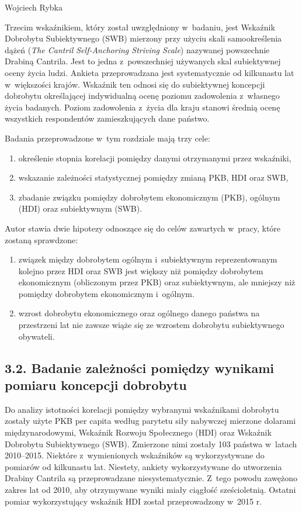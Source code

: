 \begin{artplenv}{Wojciech Rybka}
\enlargethispage{.5\baselineskip}

Trzecim wskaźnikiem, który został uwzględniony w~badaniu, jest Wskaźnik Dobrobytu Subiektywnego (SWB) mierzony przy
użyciu skali samookreślenia dążeń (\textit{The Cantril Self-Anchoring Striving Scale}) nazywanej powszechnie Drabiną
Cantrila. Jest to jedna z~powszechniej używanych skal subiektywnej oceny życia ludzi. Ankieta przeprowadzana jest
systematycznie od kilkunastu lat w~większości krajów. Wskaźnik ten odnosi się do subiektywnej koncepcji dobrobytu
określającej indywidualną ocenę poziomu zadowolenia z~własnego życia badanych. Poziom zadowolenia z~życia dla kraju
stanowi średnią ocenę wszystkich respondentów zamieszkujących dane państwo.

Badania przeprowadzone w~tym rozdziale mają trzy cele:

\begin{enumerate}
\item określenie stopnia korelacji pomiędzy danymi otrzymanymi przez wskaźniki,
\item wskazanie zależności statystycznej pomiędzy zmianą PKB, HDI oraz SWB,
\item zbadanie związku pomiędzy dobrobytem ekonomicznym (PKB), ogólnym (HDI) oraz subiektywnym (SWB).
\end{enumerate}
Autor stawia dwie hipotezy odnoszące się do celów zawartych w~pracy, które zostaną sprawdzone:

\begin{enumerate}
\item związek między dobrobytem ogólnym i~subiektywnym reprezentowanym kolejno przez HDI oraz SWB jest większy niż
pomiędzy dobrobytem ekonomicznym (obliczonym przez PKB) oraz subiektywnym, ale mniejszy niż pomiędzy dobrobytem
ekonomicznym i~ogólnym.
\item wzrost dobrobytu ekonomicznego oraz ogólnego danego państwa na przestrzeni lat nie zawsze wiąże się ze wzrostem
dobrobytu subiektywnego obywateli.
\end{enumerate}
\subsection{3.2. Badanie zależności pomiędzy wynikami pomiaru koncepcji dobrobytu}
Do analizy istotności korelacji pomiędzy wybranymi wskaźnikami dobrobytu zostały użyte PKB per capita według parytetu
siły nabywczej mierzone dolarami międzynarodowymi, Wskaźnik Rozwoju Społecznego (HDI) oraz Wskaźnik Dobrobytu
Subiektywnego (SWB). Zmierzone nimi zostały 103 państwa w~latach 2010--2015. Niektóre z~wymienionych wskaźników są
wykorzystywane do pomiarów od kilkunastu lat. Niestety, ankiety wykorzystywane do utworzenia Drabiny Cantrila są
przeprowadzane niesystematycznie. Z~tego powodu zawężono zakres lat od 2010, aby otrzymywane wyniki miały ciągłość
sześcioletnią. Ostatni pomiar wykorzystujący wskaźnik HDI został przeprowadzony w~2015 r. 


\end{artplenv}
